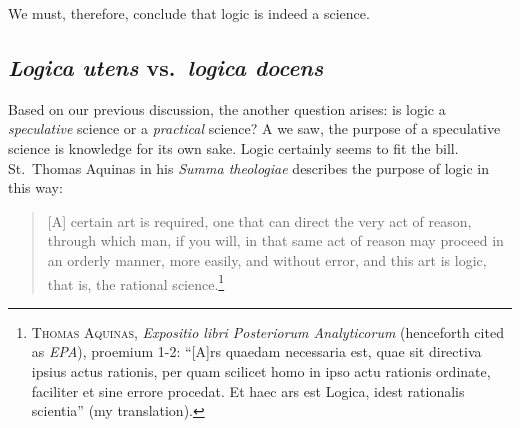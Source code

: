 \documentclass[article,12pt,a4paper,oneside]{memoir}
\begin{document}
    We must, therefore, conclude that logic is indeed a science.

    \hypertarget{logica-utens-vs.-logica-docens}{%
    \subsection{\texorpdfstring{\emph{Logica utens} vs.~\emph{logica
    docens}}{Logica utens vs.~logica docens}}\label{logica-utens-vs.-logica-docens}}

    Based on our previous discussion, the another question arises: is
    logic a \emph{speculative} science or a \emph{practical} science? A
    we saw, the purpose of a speculative science is knowledge for its
    own sake. Logic certainly seems to fit the bill. St.~Thomas Aquinas
    in his \emph{Summa theologiae} describes the purpose of logic in
    this way:

    \begin{quote}
    {[}A{]} certain art is required, one that can direct the very act of
    reason, through which man, if you will, in that same act of reason
    may proceed in an orderly manner, more easily, and without error,
    and this art is logic, that is, the rational science.\footnote{\textsc{Thomas Aquinas},
      \emph{Expositio libri Posteriorum Analyticorum} (henceforth cited
      as \emph{EPA}), proemium 1-2: ``{[}A{]}rs quaedam necessaria est,
      quae sit directiva ipsius actus rationis, per quam scilicet homo
      in ipso actu rationis ordinate, faciliter et sine errore procedat.
      Et haec ars est Logica, idest rationalis scientia'' (my
      translation).}
    \end{quote}
\end{document}
